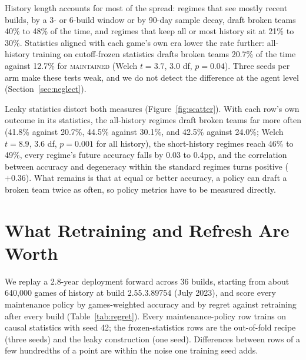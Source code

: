 \documentclass[journal]{IEEEtran}
\newcommand{\maintained}{\textsc{maintained}}          %
\begin{document}
History length accounts for most of the spread: regimes that see
mostly recent builds, by a 3- or 6-build window or by 90-day sample
decay, draft broken teams 40\% to 48\% of the time, and regimes that
keep all or most history sit at 21\% to 30\%. Statistics aligned with
each game's own era lower the rate further: all-history training on
cutoff-frozen statistics drafts broken teams 20.7\% of the time against
12.7\% for \maintained{} (Welch $t = 3.7$, 3.0 df, $p = 0.04$). Three
seeds per arm make these tests weak, and we do not detect the
difference at the agent level (Section~\ref{sec:neglect}).

Leaky statistics distort both measures (Figure~\ref{fig:scatter}). With
each row's own outcome in its statistics, the all-history regimes draft
broken teams far more often (41.8\% against 20.7\%, 44.5\% against
30.1\%, and 42.5\% against 24.0\%; Welch $t = 8.9$, 3.6 df,
$p = 0.001$ for all history), the short-history regimes reach 46\% to
49\%, every regime's future accuracy falls by 0.03 to 0.4pp, and the
correlation between accuracy and degeneracy within the standard regimes
turns positive ($+0.36$). What
remains is that at equal or better accuracy, a policy can draft a
broken team twice as often, so policy metrics have to be measured
directly.

\section{What Retraining and Refresh Are Worth}
\label{sec:replay}

We replay a 2.8-year deployment forward across 36 builds, starting from
about 640{,}000 games of history at build 2.55.3.89754 (July 2023), and
score every maintenance policy by games-weighted accuracy and by regret
against retraining after every build (Table~\ref{tab:regret}). Every
maintenance-policy row trains on causal statistics with seed 42; the
frozen-statistics rows are the out-of-fold recipe (three seeds) and the
leaky construction (one seed). Differences between rows of a few
hundredths of a point are within the noise one training seed adds.
\end{document}
